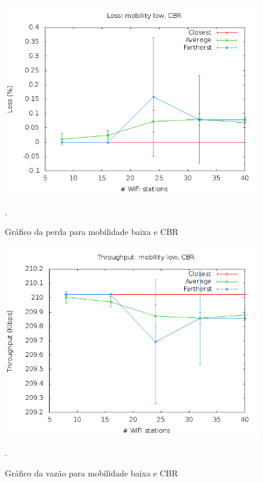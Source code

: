 \documentclass[12pt,twoside,a4paper]{article}
\begin{document}
\begin{figure}[H]
\centering
\includegraphics[scale=0.5]{mo818-loss-mob-0-traf-0}
\caption{Gráfico da perda para mobilidade baixa e CBR}.
\label{fig:perda-m0-t0}
\end{figure}

\begin{figure}[H]
\centering
\includegraphics[scale=0.5]{mo818-throughput-mob-0-traf-0}
\caption{Gráfico da vazão para mobilidade baixa e CBR}.
\label{fig:vazao-m0-t0}
\end{figure}
\end{document}
